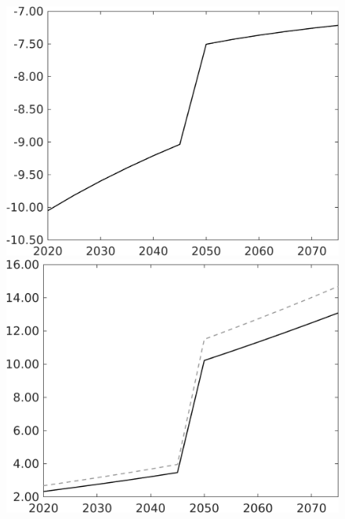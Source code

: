 \begin{figure}[h!!]
\begin{minipage}[]{0.32\textwidth}
 	\includegraphics[width=1\textwidth]{../../codding_model/own_basedOnFried/optimalPol_010922_revision/figures/all_13Sept22/CompTaufPER_bytaul_Reg0_tauf_spillover0_nsk0_xgr0_knspil0_sep0_LFlimit1_emsbase0_countec0_GovRev0_etaa0.79_lgd0.png} \end{minipage}		
\begin{minipage}[]{0.32\textwidth}
\includegraphics[width=1\textwidth]{../../codding_model/own_basedOnFried/optimalPol_010922_revision/figures/all_13Sept22/CompTauf_bytaul_Reg0_GFF_spillover0_nsk0_xgr0_knspil0_sep0_LFlimit1_emsbase0_countec0_GovRev0_etaa0.79_lgd0.png}

\end{minipage}
\end{figure}
